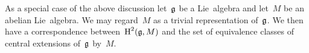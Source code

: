 \begin{fluff}
	As a special case of the above discussion let~$\mathfrak{g}$ be a Lie~algebra and let~$M$ be an abelian Lie~algebra.
	We may regard~$M$ as a trivial representation of~$\mathfrak{g}$.
	We then have a {\onetoonetext} correspondence between~$\operatorname{H}^2(\mathfrak{g}, M)$ and the set of equivalence classes of central extensions of~$\mathfrak{g}$ by~$M$.
\end{fluff}





